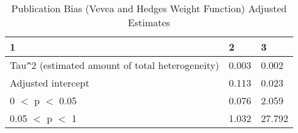 \begin{table}[ht]
\centering
\caption{Publication Bias (Vevea and Hedges Weight Function) Adjusted Estimates} 
\begingroup\small
\begin{tabular}{lll}
  \hline
1 & 2 & 3 \\ 
  \hline
Tau\verb|^|2 (estimated amount of total heterogeneity) & 0.003 & 0.002 \\ 
  Adjusted intercept & 0.113 & 0.023 \\ 
  0 $<$ p $<$ 0.05 & 0.076 & 2.059 \\ 
  0.05 $<$ p $<$ 1 & 1.032 & 27.792 \\ 
   \hline
\end{tabular}
\endgroup
\end{table}
